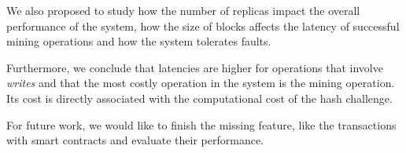 \documentclass[10pt,journal,compsoc]{IEEEtran}
\begin{document}
	We also proposed to study how the number of replicas impact the overall performance of the system, how the size of blocks affects the latency of successful mining operations and how the system tolerates faults.

	Furthermore, we conclude that latencies are higher for operations that involve \textit{writes} and that the most costly operation in the system is the mining operation. Its cost is directly associated with the computational cost of the hash challenge. 

	For future work, we would like to finish the missing feature, like the transactions with smart contracts and evaluate their performance. 

	\ifCLASSOPTIONcaptionsoff
	\newpage
	\fi
	
	
	
\end{document}
